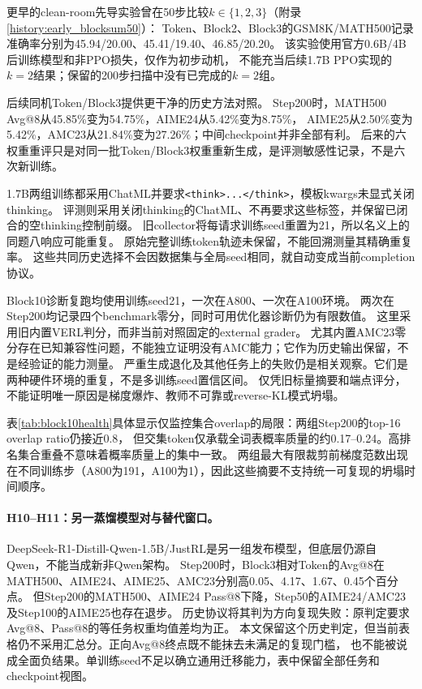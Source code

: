 更早的clean-room先导实验曾在50步比较$k\in\{1,2,3\}$（附录\ref{history:early_blocksum50}）：
Token、Block2、Block3的GSM8K/MATH500记录准确率分别为45.94/20.00、45.41/19.40、46.85/20.20。
该实验使用官方0.6B/4B后训练模型和非PPO损失，仅作为初步动机，
不能充当后续1.7B PPO实现的$k=2$结果；保留的200步扫描中没有已完成的$k=2$组。

后续同机Token/Block3提供更干净的历史方法对照。
Step200时，MATH500 Avg@8从45.85\%变为54.75\%，AIME24从5.42\%变为8.75\%，
AIME25从2.50\%变为5.42\%，AMC23从21.84\%变为27.26\%；中间checkpoint并非全部有利。
后来的六权重重评只是对同一批Token/Block3权重重新生成，是评测敏感性记录，不是六次新训练。

1.7B两组训练都采用ChatML并要求\texttt{<think>...</think>}，模板kwargs未显式关闭thinking。
评测则采用关闭thinking的ChatML、不再要求这些标签，并保留已闭合的空thinking控制前缀。
旧collector将每请求训练seed重置为21，所以名义上的同题八响应可能重复。
原始完整训练token轨迹未保留，不能回溯测量其精确重复率。
这些共同历史选择不会因数据集与全局seed相同，就自动变成当前completion协议。

Block10诊断复跑均使用训练seed21，一次在A800、一次在A100环境。
两次在Step200均记录四个benchmark零分，同时可用优化器诊断仍为有限数值。
这里采用旧内置VERL判分，而非当前对照固定的external grader。
尤其内置AMC23零分存在已知兼容性问题，不能独立证明没有AMC能力；它作为历史输出保留，不是经验证的能力测量。
严重生成退化及其他任务上的失败仍是相关观察。它们是两种硬件环境的重复，不是多训练seed置信区间。
仅凭旧标量摘要和端点评分，不能证明唯一原因是梯度爆炸、教师不可靠或reverse-KL模式坍塌。

表\ref{tab:block10health}具体显示仅监控集合overlap的局限：两组Step200的top-16 overlap ratio仍接近0.8，
但交集token仅承载全词表概率质量的约0.17--0.24。高排名集合重叠不意味着概率质量上的集中一致。
两组最大有限裁剪前梯度范数出现在不同训练步（A800为191，A100为1），因此这些摘要不支持统一可复现的坍塌时间顺序。
\begin{table}[ht]
\centering\small
\caption{保留的Block10诊断摘要。熵（nat）、overlap ratio与交集概率质量取Step200；最后一列是整次训练中最大的裁剪前梯度范数。数值来自历史诊断报告，而非新的训练复现。}
\label{tab:block10health}

\end{table}

\paragraph{H10--H11：另一蒸馏模型对与替代窗口。}
DeepSeek-R1-Distill-Qwen-1.5B/JustRL是另一组发布模型，但底层仍源自Qwen，不能当成新非Qwen架构。
Step200时，Block3相对Token的Avg@8在MATH500、AIME24、AIME25、AMC23分别高0.05、4.17、1.67、0.45个百分点。
但Step200的MATH500、AIME24 Pass@8下降，Step50的AIME24/AMC23及Step100的AIME25也存在退步。
历史协议将其判为方向复现失败：原判定要求Avg@8、Pass@8的等任务权重均值差均为正。
本文保留这个历史判定，但当前表格仍不采用汇总分。正向Avg@8终点既不能抹去未满足的复现门槛，
也不能被说成全面负结果。单训练seed不足以确立通用迁移能力，表中保留全部任务和checkpoint视图。

